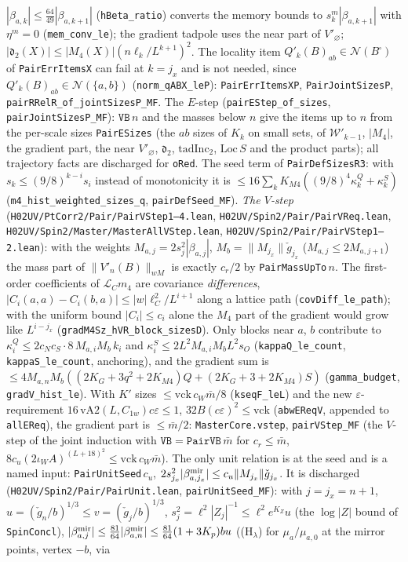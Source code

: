 \documentclass[11pt]{amsart}
\theoremstyle{definition}
\theoremstyle{remark}
\numberwithin{equation}{section}
\begin{document}
$|\beta_{a,k}|\le\frac{64}{49}|\beta_{a,k+1}|$ (\texttt{hBeta\_ratio}) converts the memory bounds to $s^m_k|\beta_{a,k+1}|$ with $\eta^m=0$ (\texttt{mem\_conv\_le}); the gradient tadpole uses the near part of $V'_\varnothing$; $|\mathfrak d_2(X)|\le|M_4(X)|(n\ell_k/L^{k+1})^2$. The locality item $Q'_k(B)_{ab}\in\mathcal N(B^\square)$ of \texttt{PairErrItemsX} can fail at $k=j_x$ and is not needed, since $Q'_k(B)_{ab}\in\mathcal N(\{a,b\})$ (\texttt{norm\_qABX\_leP}): \texttt{PairErrItemsXP}, \texttt{PairJointSizesP}, \texttt{pairRRelR\_of\_jointSizesP\_MF}. The $E$-step (\texttt{pairEStep\_of\_sizes}, \texttt{pairJointSizesP\_MF}): $\texttt{VB}\,n$ and the masses below $n$ give the items up to $n$ from the per-scale sizes \texttt{PairESizes} (the $ab$ sizes of $K_k$ on small sets, of $\mathcal W'_{k-1}$, $|M_4|$, the gradient part, the near $V'_\varnothing$, $\mathfrak d_2$, $\mathrm{tadInc}_2$, $\mathrm{Loc}\,S$ and the product parts); all trajectory facts are discharged for \texttt{oRed}. The seed term of \texttt{PairDefSizesR3}: with $s_k\le(9/8)^{k-i}s_i$ instead of monotonicity it is $\le16\sum_kK_{M4}((9/8)^4\kappa^Q_k+\kappa^S_k)$ (\texttt{m4\_hist\_weighted\_sizes\_q}, \texttt{pairDefSeed\_MF}). \emph{The $V$-step} (\texttt{H02UV/PtCorr2/Pair/PairVStep1--4.lean}, \texttt{H02UV/Spin2/Pair/PairVReq.lean}, \texttt{H02UV/Spin2/Master/MasterAllVStep.lean}, \texttt{H02UV/Spin2/Pair/PairVStep1--2.lean}): with the weights $M_{a,j}=2s_j^2|\beta_{a,j}|$, $M_b=\|M_{j_x}\|\check g_{j_x}$ ($M_{a,j}\le2M_{a,j+1}$) the mass part of $\|V'_n(B)\|_{wM}$ is exactly $c_r/2$ by \texttt{PairMassUpTo}\,$n$. The first-order coefficients of $\mathcal L_Cm_4$ are covariance \emph{differences}, $|C_i(a,a)-C_i(b,a)|\le|w|\ell_C^2/L^{i+1}$ along a lattice path (\texttt{covDiff\_le\_path}); with the uniform bound $|C_i|\le c_i$ alone the $M_4$ part of the gradient would grow like $L^{i-j_x}$ (\texttt{gradM4Sz\_hVR\_block\_sizesD}). Only blocks near $a$, $b$ contribute to $\kappa^Q_i\le2c_Nc_S\cdot8\,M_{a,i}M_b\,k_i$ and $\kappa^S_i\le2L^2M_{a,i}M_bL^2s_O$ (\texttt{kappaQ\_le\_count}, \texttt{kappaS\_le\_count}, anchoring), and the gradient sum is $\le4M_{a,n}M_b((2K_G+3q^2+2K_{M4})Q+(2K_G+3+2K_{M4})S)$ (\texttt{gamma\_budget}, \texttt{gradV\_hist\_le}). With $K'$ sizes $\le\mathrm{vck}\,c_W\bar m/8$ (\texttt{kseqF\_leL}) and the new $\varepsilon$-requirement $16\,\mathrm{vA2}(L,C_{1w})c\varepsilon\le1$, $32B(c\varepsilon)^2\le\mathrm{vck}$ (\texttt{abwEReqV}, appended to \texttt{allEReq}), the gradient part is $\le\bar m/2$: \texttt{MasterCore.vstep}, \texttt{pairVStep\_MF} (the $V$-step of the joint induction with $\texttt{VB}=\texttt{PairVB}\,\bar m$ for $c_r\le\bar m$, $8c_u(2\iota_WA)^{(L+18)^2}\le\mathrm{vck}\,c_W\bar m$). The only unit relation is at the seed and is a named input: \texttt{PairUnitSeed}\,$c_u$, $2s_{j_x}^2|\beta^{\rm mir}_{a,j_x}|\le c_u\|M_{j_x}\|\check g_{j_x}$. It is discharged (\texttt{H02UV/Spin2/Pair/PairUnit.lean}, \texttt{pairUnitSeed\_MF}): with $j=j_x=n+1$, $u=(\check g_n/b)^{1/3}\le v=(\check g_j/b)^{1/3}$, $s_j^2=\ell^2|Z_j|^{-1}\le\ell^2e^{K_Z}u$ (the $\log|Z|$ bound of \texttt{SpinConcl}), $|\beta^{\rm mir}_{a,j}|\le\frac{81}{64}|\beta^{\rm mir}_{a,n}|\le\frac{81}{64}(1+3K_p)bu$ ((H$_\lambda$) for $\mu_a/\mu_{a,0}$ at the mirror points, vertex $-b$, via 
\end{document}
